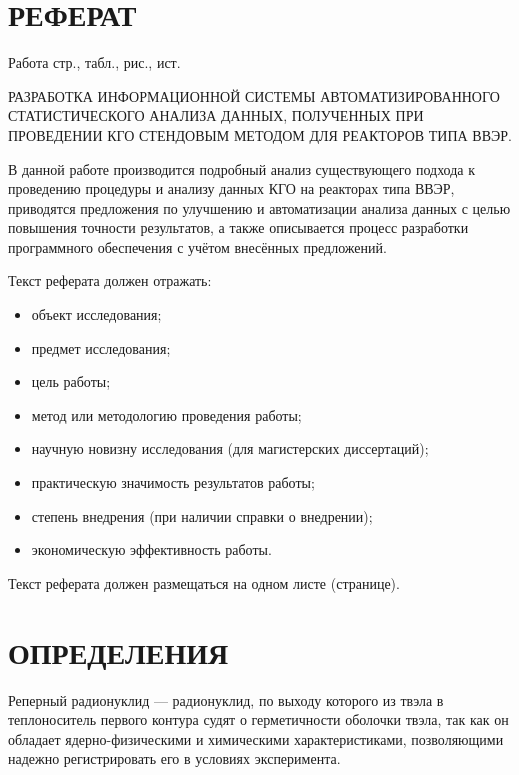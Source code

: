 \documentclass[a4paper,12pt]{article}
\begin{document}
\section*{\centering РЕФЕРАТ}

\thispagestyle{empty} %

Работа  стр.,  табл.,  рис., \totalmycitecounts ист. 

РАЗРАБОТКА ИНФОРМАЦИОННОЙ СИСТЕМЫ
АВТОМАТИЗИРОВАННОГО СТАТИСТИЧЕСКОГО АНАЛИЗА ДАННЫХ,
ПОЛУЧЕННЫХ ПРИ ПРОВЕДЕНИИ КГО СТЕНДОВЫМ МЕТОДОМ ДЛЯ
РЕАКТОРОВ ТИПА ВВЭР.

В данной работе производится подробный анализ существующего подхода к проведению процедуры и анализу данных КГО на реакторах типа ВВЭР, приводятся предложения по улучшению и автоматизации анализа данных с целью повышения точности результатов, а также описывается процесс разработки программного обеспечения с учётом внесённых предложений.

Текст реферата должен отражать:
\begin{itemize}
\item объект исследования;
\item предмет исследования;
\item цель работы;
\item метод или методологию проведения работы;
\item научную новизну исследования (для магистерских диссертаций);
\item практическую значимость результатов работы;
\item степень внедрения (при наличии справки о внедрении);
\item экономическую эффективность работы.
\end{itemize}
Текст реферата должен размещаться на одном листе (странице).

\pagebreak
\thispagestyle{empty}

\section*{\centering ОПРЕДЕЛЕНИЯ}

\thispagestyle{empty} %

Реперный радионуклид --- радионуклид, по выходу которого из твэла в
теплоноситель первого контура судят о герметичности оболочки твэла, так как
он обладает ядерно-физическими и химическими характеристиками,
позволяющими надежно регистрировать его в условиях эксперимента.
\end{document}
